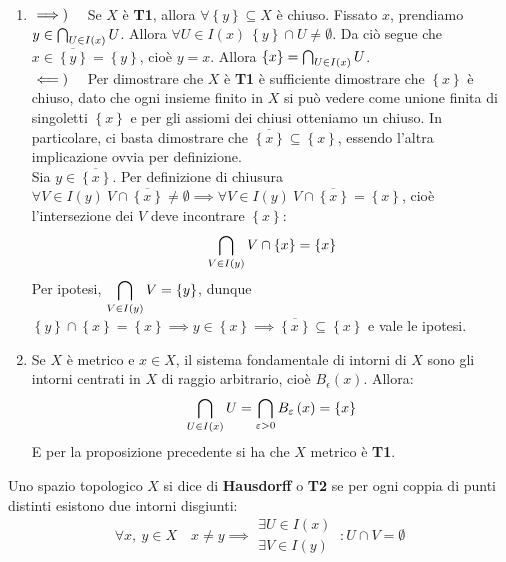 \begin{demonstration}~{}
\begin{enumerate}[label=\Roman*]
\item $\implies)\quad$ Se $X$ è \textbf{T1}, allora $\forall \left\{y\right\}\subseteq X$ è chiuso. Fissato $x$, prendiamo $y \in \mathop{{\bigcap}}\displaylimits_{U\in I\left(x\right)}U$. Allora $\forall U\in I\left(x\right)\ \left\{y\right\}\cap U\neq \emptyset$. Da ciò segue che $x\in\overline{\left\{y\right\}}=\left\{y\right\}$, cioè $y=x$. Allora $\left\{x\right\}=\mathop{{\bigcap}}\displaylimits_{U\in I\left(x\right)}U$.\\
$\impliedby)\quad$ Per dimostrare che $X$ è \textbf{T1} è sufficiente dimostrare che $\left\{x\right\}$ è chiuso, dato che ogni insieme finito in $X$ si può vedere come unione finita di singoletti $\left\{x\right\}$ e per gli assiomi dei chiusi otteniamo un chiuso. In particolare, ci basta dimostrare che $\overline{\left\{x\right\}}\subseteq \left\{x\right\}$, essendo l'altra implicazione ovvia per definizione.\\
Sia $y\in\overline{\left\{x\right\}}$. Per definizione di chiusura $\forall V\in I\left(y\right)\ V\cap\overline{\left\{x\right\}}\neq\emptyset\implies \forall V\in I\left(y\right)\ V\cap\overline{\left\{x\right\}}=\left\{x\right\}$, cioè l'intersezione dei $V$ deve incontrare $\left\{x\right\}$:
\begin{equation*}
\mathop{{\bigcap}}\displaylimits_{V\in I\left(y\right)}V\cap\left\{x\right\}=\left\{x\right\}
\end{equation*}
Per ipotesi, $\displaystyle \mathop{{\bigcap}}\displaylimits_{V\in I\left(y\right)}V=\left\{y\right\}$, dunque $\left\{y\right\}\cap \left\{x\right\}=\left\{x\right\}\implies y\in\left\{x\right\}\implies\overline{\left\{x\right\}}\subseteq \left\{x\right\}$ e vale le ipotesi.
\item Se $X$ è metrico e $x\in X$, il sistema fondamentale di intorni di $X$ sono gli intorni centrati in $X$ di raggio arbitrario, cioè $B_{\epsilon}\left(x\right)$. Allora:
\begin{equation*}
\mathop{{\bigcap}}\displaylimits_{U\in I\left(x\right)}U=\mathop{{\bigcap}}\displaylimits_{\varepsilon > 0}B_{\varepsilon}\left(x\right)=\left\{x\right\}
\end{equation*}
E per la proposizione precedente si ha che $X$ metrico è \textbf{T1}.
\end{enumerate}
\end{demonstration}
\begin{define}
Uno spazio topologico $X$ si dice di \textbf{Hausdorff} o \textbf{T2} se per ogni coppia di punti distinti esistono due intorni disgiunti:
\begin{equation}
	\forall x,\ y\in X\quad x\neq y\implies
	\begin{array}{l}
		\exists U\in I\left(x\right)\\
		\exists V\in I\left(y\right)
	\end{array}
\ \colon U\cap V=\emptyset
\end{equation}
\end{define}
